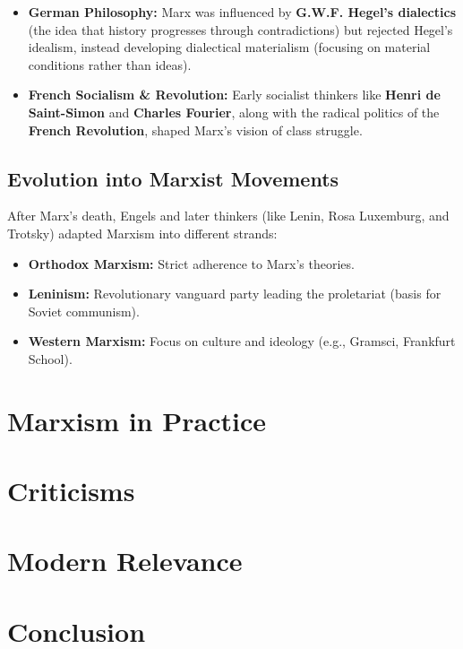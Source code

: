 \documentclass[14pt, russian]{matmex-diploma-custom}
\begin{document}
\begin{itemize}
    \item \textbf{German Philosophy:} Marx was influenced by \textbf{G.W.F. Hegel’s dialectics} (the idea that history progresses through contradictions) but rejected Hegel’s idealism, instead developing dialectical materialism (focusing on material conditions rather than ideas).
    \item \textbf{French Socialism & Revolution:} Early socialist thinkers like \textbf{Henri de Saint-Simon} and \textbf{Charles Fourier}, along with the radical politics of the \textbf{French Revolution}, shaped Marx’s vision of class struggle.
\end{itemize}

\subsection{Evolution into Marxist Movements}
After Marx’s death, Engels and later thinkers (like Lenin, Rosa Luxemburg, and Trotsky) adapted Marxism into different strands:

\begin{itemize}
    \item \textbf{Orthodox Marxism:} Strict adherence to Marx’s theories.
    \item \textbf{Leninism:} Revolutionary vanguard party leading the proletariat (basis for Soviet communism).
    \item \textbf{Western Marxism:} Focus on culture and ideology (e.g., Gramsci, Frankfurt School).
\end{itemize}

\section{Marxism in Practice}

\section{Criticisms}
\section{Modern Relevance}
\section{Conclusion}
\end{document}
